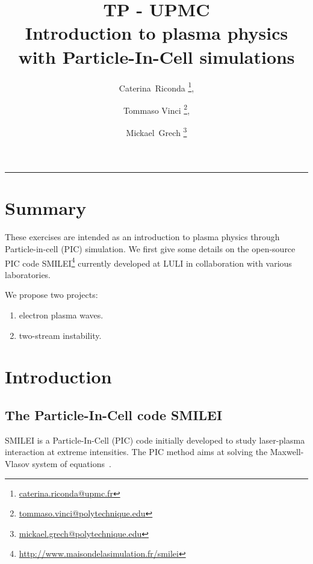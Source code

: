 \documentclass[11pt,a4paper]{article}
\begin{document}
\title{TP - UPMC \\ Introduction to plasma physics with Particle-In-Cell simulations}


\author{Caterina~Riconda \footnote{\url{caterina.riconda@upmc.fr}}, \and Tommaso Vinci \footnote{\url{tommaso.vinci@polytechnique.edu}}, \and Mickael~Grech \footnote{\url{mickael.grech@polytechnique.edu}} }

\date{}

\maketitle              

\vspace*{-20pt}
\hrule
\section*{Summary}
These exercises are intended as an introduction to plasma physics through Particle-in-cell (PIC) simulation.
We first give some details on the open-source PIC code SMILEI\footnote{\url{http://www.maisondelasimulation.fr/smilei}} currently developed at LULI in collaboration with various laboratories.

We propose two projects: 
\begin{enumerate}
\item electron plasma waves.
\item two-stream instability.
\end{enumerate}




\section*{Introduction}\label{intro}

\subsection*{The Particle-In-Cell code SMILEI}

SMILEI is a Particle-In-Cell (PIC) code initially developed to study laser-plasma interaction at extreme intensities. 
The PIC method aims at solving the Maxwell-Vlasov system of  equations~\cite{birdsall_langdon}.
\end{document}
